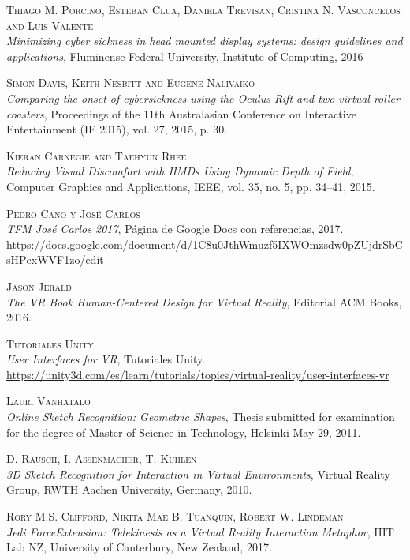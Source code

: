 \documentclass[12pt,a4paper]{article}
\begin{document}
\break

\begin{thebibliography}{X}

\textsc{Thiago M. Porcino, Esteban Clua, Daniela Trevisan, Cristina N. Vasconcelos and Luis Valente}\\
\textit{Minimizing cyber sickness in head mounted display systems: design guidelines and applications}, Fluminense Federal University, Institute of Computing, 2016

\textsc{Simon Davis, Keith Nesbitt and Eugene Nalivaiko}\\
\textit{Comparing the onset of cybersickness using the Oculus Rift and two virtual roller coasters}, Proceedings of the 11th Australasian Conference on Interactive Entertainment (IE 2015), vol. 27, 2015, p. 30.

\textsc{Kieran Carnegie and Taehyun Rhee}\\
\textit{Reducing Visual Discomfort with HMDs Using Dynamic Depth of Field}, Computer Graphics and Applications, IEEE, vol. 35, no. 5, pp. 34–41, 2015.

\textsc{Pedro Cano y José Carlos}\\
\textit{TFM José Carlos 2017}, Página de Google Docs con referencias, 2017.\\
\url{https://docs.google.com/document/d/1C8u0JthWmuzf5IXWOmzsdw0pZUjdrSbCsHPcxWVF1zo/edit}

\textsc{Jason Jerald}\\
\textit{The VR Book Human-Centered Design for Virtual Reality}, Editorial ACM Books, 2016.

\textsc{Tutoriales Unity}\\
\textit{User Interfaces for VR}, Tutoriales Unity.\\
\url{https://unity3d.com/es/learn/tutorials/topics/virtual-reality/user-interfaces-vr}

\textsc{Lauri Vanhatalo}\\
\textit{Online Sketch Recognition: Geometric Shapes}, Thesis submitted for examination for the degree of Master of Science in Technology, Helsinki May 29, 2011.

\textsc{D. Rausch, I. Assenmacher, T. Kuhlen}\\
\textit{3D Sketch Recognition for Interaction in Virtual Environments}, Virtual Reality Group, RWTH Aachen University, Germany, 2010.

\textsc{Rory M.S. Clifford, Nikita Mae B. Tuanquin, Robert W. Lindeman}\\
\textit{Jedi ForceExtension: Telekinesis as a Virtual Reality Interaction Metaphor}, HIT Lab NZ, University of Canterbury, New Zealand, 2017.

\end{thebibliography}
\end{document}
